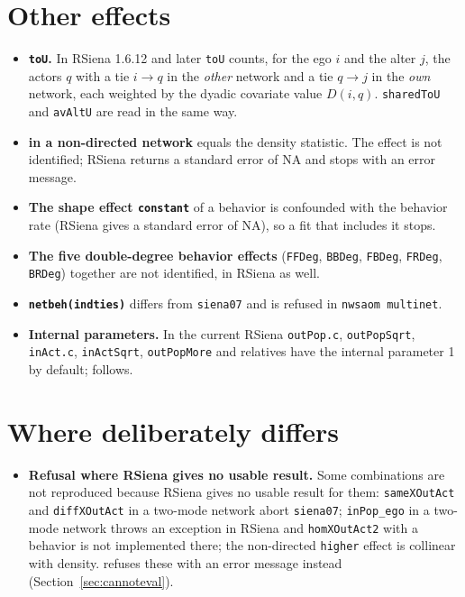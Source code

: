 \section*{Other effects}

\begin{itemize}
\item \textbf{\texttt{toU}.} In RSiena 1.6.12 and later \texttt{toU} counts, for the ego $i$
  and the alter $j$, the actors $q$ with a tie $i\to q$ in the \emph{other} network and a
  tie $q\to j$ in the \emph{own} network, each weighted by the dyadic covariate value $D(i,q)$.
  \texttt{sharedToU} and \texttt{avAltU} are read in the same way.
\item \textbf{ in a non-directed network} equals the density statistic.
  The effect is not identified; RSiena returns a standard error of NA and \nwsaom{} stops with
  an error message.
\item \textbf{The shape effect \texttt{constant}} of a behavior is confounded with the
  behavior rate (RSiena gives a standard error of NA), so a fit that includes it stops.
\item \textbf{The five double-degree behavior effects} (\texttt{FFDeg}, \texttt{BBDeg},
  \texttt{FBDeg}, \texttt{FRDeg}, \texttt{BRDeg}) together are not identified, in RSiena as well.
\item \textbf{\texttt{netbeh(indties)}} differs from \texttt{siena07} and is refused in
  \texttt{nwsaom multinet}.
\item \textbf{Internal parameters.} In the current RSiena \texttt{outPop.c}, \texttt{outPopSqrt},
  \texttt{inAct.c}, \texttt{inActSqrt}, \texttt{outPopMore} and relatives have the internal
  parameter 1 by default; \nwsaom{} follows.
\end{itemize}

\section*{Where \nwsaom{} deliberately differs}

\begin{itemize}
\item \textbf{Refusal where RSiena gives no usable result.} Some combinations are not reproduced
  because RSiena gives no usable result for them: \texttt{sameXOutAct} and
  \texttt{diffXOutAct} in a two-mode network abort \texttt{siena07}; \texttt{inPop\_ego}
  in a two-mode network throws an exception in RSiena and \texttt{homXOutAct2} with a behavior is not implemented there;
  the non-directed \texttt{higher} effect is collinear with density. \nwsaom{}
  refuses these with an error message instead (Section~\ref{sec:cannoteval}).
\end{itemize}

